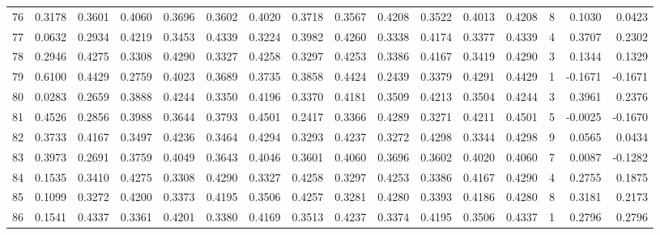 \begin{tabular}{lrrrrrrrrrrrrrrr}
76  &      0.3178 &  0.3601 &  0.4060 &  0.3696 &  0.3602 &  0.4020 &  0.3718 &  0.3567 &  0.4208 &  0.3522 &   0.4013 &     0.4208 &      8 &                    0.1030 &                     0.0423 \\
77  &      0.0632 &  0.2934 &  0.4219 &  0.3453 &  0.4339 &  0.3224 &  0.3982 &  0.4260 &  0.3338 &  0.4174 &   0.3377 &     0.4339 &      4 &                    0.3707 &                     0.2302 \\
78  &      0.2946 &  0.4275 &  0.3308 &  0.4290 &  0.3327 &  0.4258 &  0.3297 &  0.4253 &  0.3386 &  0.4167 &   0.3419 &     0.4290 &      3 &                    0.1344 &                     0.1329 \\
79  &      0.6100 &  0.4429 &  0.2759 &  0.4023 &  0.3689 &  0.3735 &  0.3858 &  0.4424 &  0.2439 &  0.3379 &   0.4291 &     0.4429 &      1 &                   -0.1671 &                    -0.1671 \\
80  &      0.0283 &  0.2659 &  0.3888 &  0.4244 &  0.3350 &  0.4196 &  0.3370 &  0.4181 &  0.3509 &  0.4213 &   0.3504 &     0.4244 &      3 &                    0.3961 &                     0.2376 \\
81  &      0.4526 &  0.2856 &  0.3988 &  0.3644 &  0.3793 &  0.4501 &  0.2417 &  0.3366 &  0.4289 &  0.3271 &   0.4211 &     0.4501 &      5 &                   -0.0025 &                    -0.1670 \\
82  &      0.3733 &  0.4167 &  0.3497 &  0.4236 &  0.3464 &  0.4294 &  0.3293 &  0.4237 &  0.3272 &  0.4298 &   0.3344 &     0.4298 &      9 &                    0.0565 &                     0.0434 \\
83  &      0.3973 &  0.2691 &  0.3759 &  0.4049 &  0.3643 &  0.4046 &  0.3601 &  0.4060 &  0.3696 &  0.3602 &   0.4020 &     0.4060 &      7 &                    0.0087 &                    -0.1282 \\
84  &      0.1535 &  0.3410 &  0.4275 &  0.3308 &  0.4290 &  0.3327 &  0.4258 &  0.3297 &  0.4253 &  0.3386 &   0.4167 &     0.4290 &      4 &                    0.2755 &                     0.1875 \\
85  &      0.1099 &  0.3272 &  0.4200 &  0.3373 &  0.4195 &  0.3506 &  0.4257 &  0.3281 &  0.4280 &  0.3393 &   0.4186 &     0.4280 &      8 &                    0.3181 &                     0.2173 \\
86  &      0.1541 &  0.4337 &  0.3361 &  0.4201 &  0.3380 &  0.4169 &  0.3513 &  0.4237 &  0.3374 &  0.4195 &   0.3506 &     0.4337 &      1 &                    0.2796 &                     0.2796 \\

\end{tabular}
